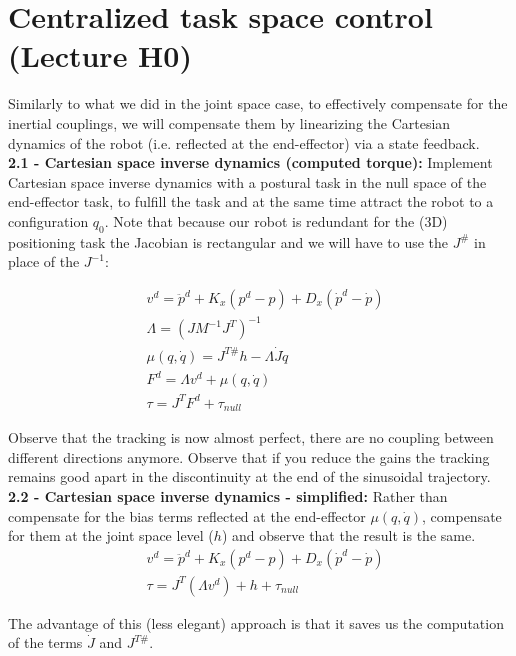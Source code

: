 \documentclass[11pt]{article}
\begin{document}
\section{Centralized task space control (Lecture H0)}

Similarly to what we did in the joint space case, to effectively compensate for the inertial couplings, we will compensate them by linearizing the Cartesian dynamics of the robot (i.e. reflected at the end-effector) via a state feedback.\\


\textbf{2.1 - Cartesian space inverse dynamics (computed torque):}
Implement Cartesian space inverse dynamics with a postural task in the null space of the end-effector task, to fulfill the task and at the same time attract the robot to a configuration $q_0$. 
Note that because our robot is redundant for the (3D) positioning task the Jacobian is rectangular and we will have to use the $J^{\#}$ in place of the $J^{-1}$:

\begin{align}
&v^d =  \ddot{p}^d + K_x(p^d - p) + D_x(\dot{p}^d -\dot{p})  \\
& \Lambda = (J M^{-1}J^T)^{-1}\\
&\mu(q,\dot{q})  = J^{T\#} h -\Lambda \dot{J} \dot{q} \\
&F^d = \Lambda v^d +  \mu(q,\dot{q})\\
&\tau  = J^TF^d+ \tau_{null}
\end{align}


Observe that the tracking is now almost perfect, there are no coupling between different directions anymore.  Observe that if you reduce the gains the tracking remains good apart in the discontinuity at the end of the sinusoidal trajectory.  \\



\textbf{2.2 - Cartesian space inverse dynamics - simplified:}
Rather than compensate for the bias terms reflected at the end-effector $\mu(q,\dot{q})$,  compensate for them at the joint space level ($h$) and observe that the result is the same. 
\begin{align}
&v^d = \ddot{p}^d + K_x(p^d - p) + D_x(\dot{p}^d -\dot{p})  \\
&\tau  = J^T\left( \Lambda v^d  \right) + h + \tau_{null}
\end{align}

The advantage of this (less elegant) approach is that it saves us the computation of the terms $\dot{J}$ and $J^{T\#}$.\\
\end{document}
